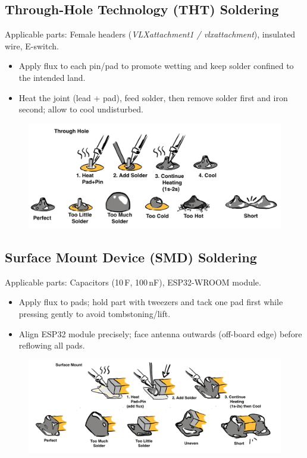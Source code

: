 \begin{manualblock}
\subsection*{Through-Hole Technology (THT) Soldering}
Applicable parts: Female headers (\textit{VLXattachment1 / vlxattachment}), insulated wire, E-switch.
\begin{itemize}
  \item Apply flux to each pin/pad to promote wetting and keep solder confined to the intended land.
  \item Heat the joint (lead + pad), feed solder, then remove solder first and iron second; allow to cool undisturbed.
\end{itemize}

\begin{figure}[H]
  \centering
  \includegraphics[width=0.5\linewidth]{img/manual/solder1.png}
\end{figure}

\subsection*{Surface Mount Device (SMD) Soldering}
Applicable parts: Capacitors (10\,\textmu F, 100\,nF), ESP32-WROOM module.
\begin{itemize}
  \item Apply flux to pads; hold part with tweezers and tack one pad first while pressing gently to avoid tombstoning/lift.
  \item Align ESP32 module precisely; face antenna outwards (off-board edge) before reflowing all pads.
\end{itemize}


\begin{figure}[H]
  \centering
  \includegraphics[width=0.5\linewidth]{img/manual/solder2.png}
\end{figure}


\end{manualblock}
